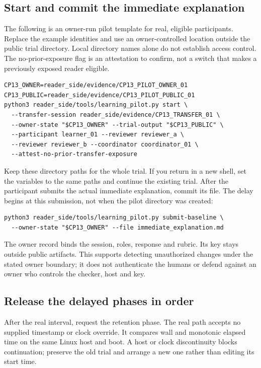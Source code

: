 \subsection{Start and commit the immediate explanation}

The following is an owner-run pilot template for real, eligible participants. Replace the example identities and use an owner-controlled location outside the public trial directory. Local directory names alone do not establish access control. The no-prior-exposure flag is an attestation to confirm, not a switch that makes a previously exposed reader eligible.

\begin{lstlisting}
CP13_OWNER=reader_side/evidence/CP13_PILOT_OWNER_01
CP13_PUBLIC=reader_side/evidence/CP13_PILOT_PUBLIC_01
python3 reader_side/tools/learning_pilot.py start \
  --transfer-session reader_side/evidence/CP13_TRANSFER_01 \
  --owner-state "$CP13_OWNER" --trial-output "$CP13_PUBLIC" \
  --participant learner_01 --reviewer reviewer_a \
  --reviewer reviewer_b --coordinator coordinator_01 \
  --attest-no-prior-transfer-exposure
\end{lstlisting}

Keep these directory paths for the whole trial. If you return in a new shell, set the variables to the same paths and continue the existing trial. After the participant submits the actual immediate explanation, commit its file. The delay begins at this submission, not when the pilot directory was created:

\Needspace{6\baselineskip}
\begin{lstlisting}
python3 reader_side/tools/learning_pilot.py submit-baseline \
  --owner-state "$CP13_OWNER" --file immediate_explanation.md
\end{lstlisting}

The owner record binds the session, roles, response and rubric. Its key stays outside public artifacts. This supports detecting unauthorized changes under the stated owner boundary; it does not authenticate the humans or defend against an owner who controls the checker, host and key.

\subsection{Release the delayed phases in order}

After the real interval, request the retention phase. The real path accepts no supplied timestamp or clock override. It compares wall and monotonic elapsed time on the same Linux host and boot. A host or clock discontinuity blocks continuation; preserve the old trial and arrange a new one rather than editing its start time.

